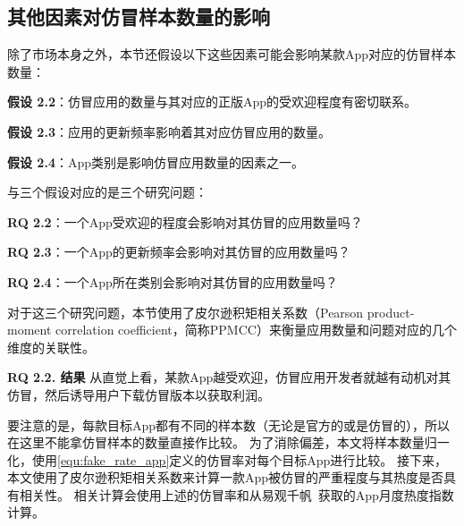 \subsection{其他因素对仿冒样本数量的影响}
除了市场本身之外，本节还假设以下这些因素可能会影响某款App对应的仿冒样本数量：

{\bf 假设 2.2}：仿冒应用的数量与其对应的正版App的受欢迎程度有密切联系。

{\bf 假设 2.3}：应用的更新频率影响着其对应仿冒应用的数量。

{\bf 假设 2.4}：App类别是影响仿冒应用数量的因素之一。

与三个假设对应的是三个研究问题：

{\bf RQ 2.2}：一个App受欢迎的程度会影响对其仿冒的应用数量吗？

{\bf RQ 2.3}：一个App的更新频率会影响对其仿冒的应用数量吗？

{\bf RQ 2.4}：一个App所在类别会影响对其仿冒的应用数量吗？

对于这三个研究问题，本节使用了皮尔逊积矩相关系数（Pearson product-moment correlation coefficient，简称PPMCC）来衡量应用数量和问题对应的几个维度的关联性。

{\bf RQ 2.2. 结果}
从直觉上看，某款App越受欢迎，仿冒应用开发者就越有动机对其仿冒，然后诱导用户下载仿冒版本以获取利润。

要注意的是，每款目标App都有不同的样本数（无论是官方的或是仿冒的），所以在这里不能拿仿冒样本的数量直接作比较。
为了消除偏差，本文将样本数量归一化，使用\autoref{equ:fake_rate_app}定义的仿冒率对每个目标App进行比较。
接下来，本文使用了皮尔逊积矩相关系数来计算一款App被仿冒的严重程度与其热度是否具有相关性。
相关计算会使用上述的仿冒率和从易观千帆~\cite{yiguanqianfan}获取的App月度热度指数计算。


